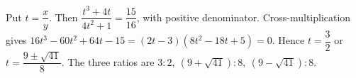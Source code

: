 Put $t=\dfrac{x}{y}$. Then $\dfrac{t^3+4t}{4t^2+1}=\dfrac{15}{16}$, with positive denominator. Cross-multiplication gives $16t^3-60t^2+64t-15=(2t-3)(8t^2-18t+5)=0$. Hence $t=\dfrac{3}{2}$ or $t=\dfrac{9\pm\sqrt{41}}{8}$. The three ratios are $\boxed{3:2,\ (9+\sqrt{41}):8,\ (9-\sqrt{41}):8}$.
